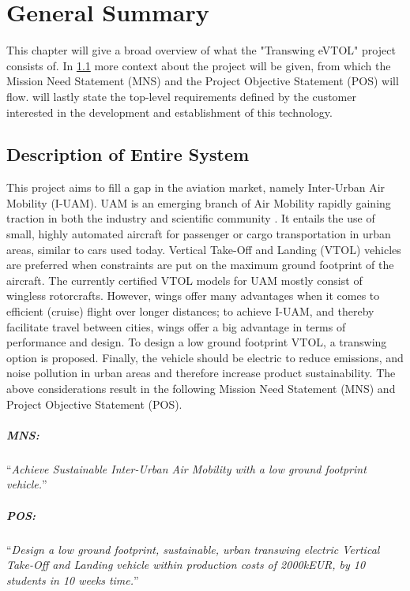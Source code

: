 \chapter{General Summary}
\label{ch:General_Summary}
This chapter will give a broad overview of what the "Transwing eVTOL" project consists of.
In \cref{sec:description-of-entire-system} more context about the project will be given, from which the Mission Need Statement (MNS) and the Project Objective Statement (POS) will flow.
 will lastly state the top-level requirements defined by the customer interested in the development and establishment of this technology.

\section{Description of Entire System}
\label{sec:description-of-entire-system}
This project aims to fill a gap in the aviation market, namely Inter-Urban Air Mobility (I-UAM).
UAM is an emerging branch of Air Mobility rapidly gaining traction in both the industry and scientific community \cite{UAM-Overview}.
It entails the use of small, highly automated aircraft for passenger or cargo transportation in urban areas, similar to cars used today.
Vertical Take-Off and Landing (VTOL) vehicles are preferred when constraints are put on the maximum ground footprint of the aircraft.
The currently certified VTOL models for UAM mostly consist of wingless rotorcrafts.
However, wings offer many advantages when it comes to efficient (cruise) flight over longer distances; to achieve I-UAM, and thereby facilitate travel between cities, wings offer a big advantage in terms of performance and design.
To design a low ground footprint VTOL, a transwing option is proposed.
Finally, the vehicle should be electric to reduce emissions, and noise pollution in urban areas and therefore increase product sustainability.
The above considerations result in the following Mission Need Statement (MNS) and Project Objective Statement (POS).

\paragraph{MNS:}“\textit{Achieve Sustainable Inter-Urban Air Mobility with a low ground footprint vehicle.}”
\vspace{-5mm}
\paragraph{POS:}“\textit{Design a low ground footprint, sustainable, urban transwing electric Vertical Take-Off and Landing vehicle within production costs of \num{2000}kEUR, by 10 students in 10 weeks time.}”



